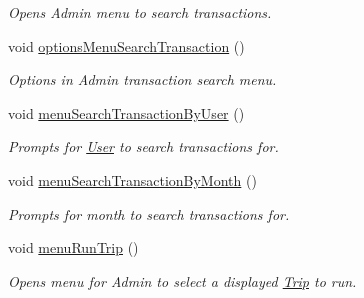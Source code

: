 \begin{Indent}
\begin{DoxyCompactItemize}
\begin{DoxyCompactList}\small\item\em Opens Admin menu to search transactions. \end{DoxyCompactList}\item 
void \hyperlink{group___agency_ga766926448390b8388cd1633c5c221318}{options\+Menu\+Search\+Transaction} ()
\begin{DoxyCompactList}\small\item\em Options in Admin transaction search menu. \end{DoxyCompactList}\item 
void \hyperlink{group___agency_ga24e634ecf44a266d90758022ae516032}{menu\+Search\+Transaction\+By\+User} ()
\begin{DoxyCompactList}\small\item\em Prompts for \hyperlink{class_user}{User} to search transactions for. \end{DoxyCompactList}\item 
void \hyperlink{group___agency_gaba8bea8c53bffa9e4eef2289267907bd}{menu\+Search\+Transaction\+By\+Month} ()
\begin{DoxyCompactList}\small\item\em Prompts for month to search transactions for. \end{DoxyCompactList}\item 
void \hyperlink{group___agency_ga4e0dc0a2296c122cf7769600abc06223}{menu\+Run\+Trip} ()
\begin{DoxyCompactList}\small\item\em Opens menu for Admin to select a displayed \hyperlink{class_trip}{Trip} to run. \end{DoxyCompactList}\end{DoxyCompactItemize}
\end{Indent}
